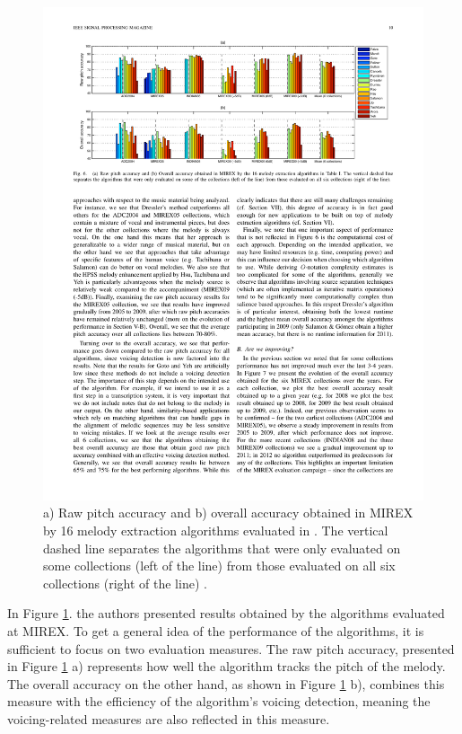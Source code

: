 \begin{figure}[t]
  \centering
    \includegraphics[width=\textwidth]{Figures/comparisonall}
      \caption{a) Raw pitch accuracy and b) overall accuracy obtained in MIREX by 16 melody extraction algorithms evaluated in \cite{comparison}. The vertical dashed line separates the algorithms that were only evaluated on some collections (left of the line) from those evaluated on all six collections (right of the line) \cite{comparison}.}
\label{fig:comparison}
\end{figure}


In Figure \ref{fig:comparison}. the authors presented results obtained by the algorithms evaluated at MIREX. To get a general idea of the performance of the algorithms, it is sufficient to focus on two evaluation measures.
The raw pitch accuracy, presented in Figure \ref{fig:comparison} a) represents how well the algorithm tracks the pitch of the melody. The overall accuracy on the other hand, as shown in Figure \ref{fig:comparison} b), combines this measure with the efficiency of the algorithm's voicing detection, meaning the voicing-related measures are also reflected in this measure.

